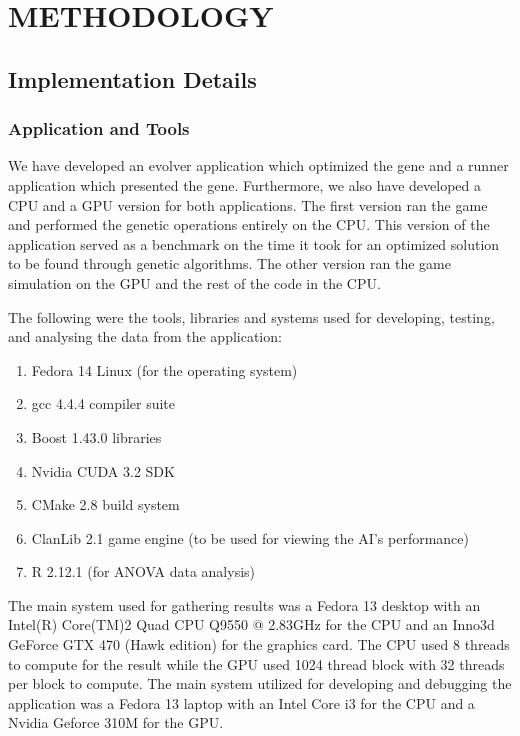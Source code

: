 \chapter{METHODOLOGY}
%
%
\section{Implementation Details}

\subsection{Application and Tools}
We have developed an evolver application which optimized the gene and a runner
application which presented the gene. Furthermore, we also have developed a CPU and
a GPU version for both applications. The first version ran the game and performed 
the genetic operations entirely on the CPU. This version of the application served 
as a benchmark on the time it took for an optimized solution to be found through 
genetic algorithms. The other version ran the game simulation on the GPU and 
the rest of the code in the CPU.


The following were the tools, libraries and systems used for developing, testing,
and analysing the data from the application:

\begin{enumerate}
  \item Fedora 14 Linux (for the operating system)
  \item gcc 4.4.4 compiler suite
  \item Boost 1.43.0 libraries
  \item Nvidia CUDA 3.2 SDK
  \item CMake 2.8 build system
  \item ClanLib 2.1 game engine (to be used for viewing the AI's performance)
  \item R 2.12.1 (for ANOVA data analysis)
\end{enumerate}

The main system used for gathering results was a Fedora 13 desktop with an 
Intel(R) Core(TM)2 Quad CPU Q9550 @ 2.83GHz for the CPU and an 
Inno3d GeForce GTX 470 (Hawk edition) for the graphics card. The CPU used 8
threads to compute for the result while the GPU used 1024 thread block with
32 threads per block to compute. The main system utilized for developing and 
debugging the application was a Fedora 13 laptop with an Intel Core i3 for 
the CPU and a Nvidia Geforce 310M for the GPU.


